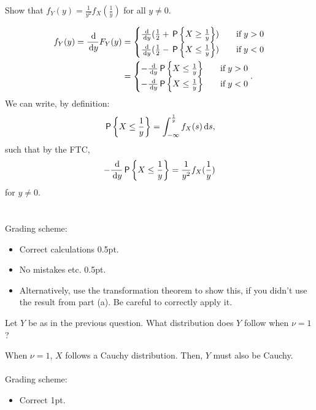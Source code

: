 \begin{exercise}[1]
Show that $f_Y(y) = \frac{1}{y^2}f_X(\frac{1}{y})$ for all $y\neq0$.
\begin{solution}
\begin{align*}
    f_Y(y) = \frac{\d}{\d y} F_Y(y) &= \begin{cases}
    \frac{\d}{\d y}(\frac12 + \P{X\geq\frac{1}{y}})&\quad\text{if}\;y>0\\
    \frac{\d}{\d y}(\frac12 - \P{X\leq\frac1y})&\quad\text{if}\;y<0
    \end{cases}\\
    &=\begin{cases}
    -\frac{\d}{\d y}\P{X\leq\frac{1}{y}}&\quad\text{if}\;y>0\\
    -\frac{\d}{\d y}\P{X\leq\frac{1}{y}}&\quad\text{if}\;y<0
    \end{cases}.
\end{align*}
We can write, by definition:
\begin{align*}
    \,\mathsf{P}\left\{X\leq\frac{1}{y}\right\} = \int_{-\infty}^{\frac1y}{f_X(s)\,\textrm{d}s},
\end{align*}
such that by the FTC,
\begin{align*}
    -\frac{\d}{\d y}\P{X\leq\frac{1}{y}} = \frac{1}{y^2}f_X(\frac1y)
\end{align*}
for $y\neq0$.\\
\\\\
Grading scheme:
\begin{itemize}
    \item Correct calculations 0.5pt.
    \item No mistakes etc. 0.5pt.
    \item Alternatively, use the transformation theorem to show this, if you didn't use the result from part (a). Be careful to correctly apply it.
\end{itemize}
\end{solution}
\end{exercise}

\begin{exercise}[1]
Let $Y$ be as in the previous question. What distribution does $Y$ follow when $\nu=1$?
\begin{solution}
When $\nu=1$, $X$ follows a Cauchy distribution. Then, $Y$ must also be Cauchy.
\\\\
Grading scheme:
\begin{itemize}
    \item Correct 1pt.
\end{itemize}
\end{solution}
\end{exercise}

